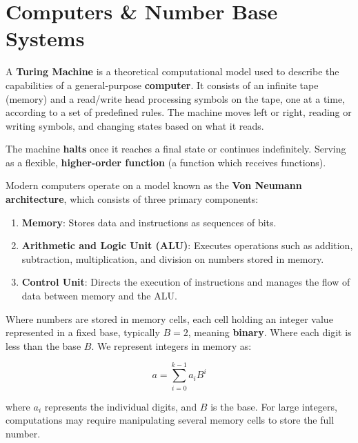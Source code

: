 \vspace{-2em}
\section{Computers \& Number Base Systems}
 

\begin{Def}

    A \textbf{Turing Machine} is a theoretical computational model used to describe the capabilities of a general-purpose \textbf{computer}. It consists of an infinite tape (memory) and a read/write head processing symbols on the tape, one at a time, according to a set of predefined rules. The machine moves left or right, reading or writing symbols, and changing states based on what it reads. 
    
    The machine \textbf{halts} once it reaches a final state or continues indefinitely. Serving as a flexible, \textbf{higher-order function} (a function which receives functions).
\end{Def}

\begin{Def}

    Modern computers operate on a model known as the \textbf{Von Neumann architecture}, which consists of three primary components:
    \begin{enumerate}
        \item \textbf{Memory}: Stores data and instructions as sequences of bits.
        \item \textbf{Arithmetic and Logic Unit (ALU)}: Executes operations such as addition, subtraction, multiplication, and division on numbers stored in memory.
        \item \textbf{Control Unit}: Directs the execution of instructions and manages the flow of data between memory and the ALU.
    \end{enumerate}
    
    \noindent
    Where numbers are stored in memory cells, each cell holding an integer value represented in a fixed base, typically \(B = 2\), meaning \textbf{binary}. Where each digit is less than the base \(B\). We represent integers in memory as:
    
    \[
    a = \sum_{i=0}^{k-1} a_i B^i
    \]
    
    \noindent
    where \( a_i \) represents the individual digits, and \(B\) is the base. For large integers, computations may require manipulating several memory cells to store the full number.
\end{Def}

